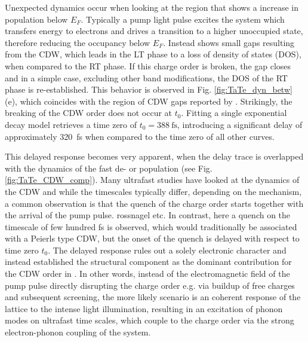 Unexpected dynamics occur when looking at the region that shows a increase in population below $E_F$.
Typically a pump light pulse excites the system which transfers energy to electrons and drives a transition to a higher unoccupied state, therefore reducing the occupancy below $E_F$.
Instead  shows small gaps resulting from the CDW, which leads in the LT phase to a loss of density of states (DOS), when compared to the RT phase.
If this charge order is broken, the gap closes and in a simple case, excluding other band modifications, the DOS of the RT phase is re-established.
This behavior is observed in Fig. \ref{fig:TaTe_dyn_betw} (e), which coincides with the region of CDW gaps reported by \cite{lin_evidence_2022}.
Strikingly, the breaking of the CDW order does not occur at $t_0$.
Fitting a single exponential decay model retrieves a time zero of $t_0=\qty{388}{\femto\second}$, introducing a significant delay of approximately \qty{320}{\femto\second} when compared to the time zero of all other curves.

This delayed response becomes very apparent, when the delay trace is overlapped with the dynamics of the fast de- or population (see Fig. \ref{fig:TaTe_CDW_comp}).
Many ultrafast studies have looked at the dynamics of the CDW and while the timescales typically differ, depending on the mechanism, a common observation is that the quench of the charge order starts together with the arrival of the pump pulse. \cite{} rossnagel etc.
In contrast, here a quench on the timescale of few hundred \unit{\femto\second} is observed, which would traditionally be associated with a Peierls type CDW, but the onset of the quench is delayed with respect to time zero $t_0$.
The delayed response rules out a solely electronic character and instead established the structural component as the dominant contribution for the CDW order in .
In other words, instead of the electromagnetic field of the pump pulse directly disrupting the charge order e.g. via buildup of free charges and subsequent screening, the more likely scenario is an coherent response of the lattice to the intense light illumination, resulting in an excitation of phonon modes on ultrafast time scales, which couple to the charge order via the strong electron-phonon coupling of the system.

